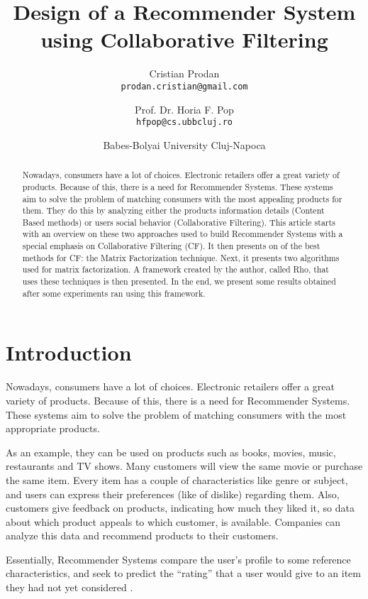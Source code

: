 \documentclass[10pt,a4paper]{article}  %
\title{Design of a Recommender System using Collaborative Filtering}
\author{
    Cristian Prodan \\ 
		\small{\texttt{prodan.cristian@gmail.com}} \\
		\and
		Prof. Dr. Horia F. Pop \\
		\small{\texttt{hfpop@cs.ubbcluj.ro}} \\
}
\date{Babes-Bolyai University Cluj-Napoca}
\begin{document}
\maketitle


\begin{abstract}
    \small{Nowadays, consumers have a lot of choices. Electronic retailers offer a great variety of products. Because of this, there is a need for Recommender Systems. These systems aim to solve the problem of matching consumers with the most appealing products for them. They do this by analyzing either the products information details (Content Based methods) or users social behavior (Collaborative Filtering). This article starts with an overview on these two approaches used to build Recommender Systems with a special emphasis on Collaborative Filtering (CF). It then presents on of the best methods for CF: the Matrix Factorization technique. Next, it presents two algorithms used for matrix factorization. A framework created by the author, called Rho, that uses these techniques is then presented. In the end, we present some results obtained after some experiments ran using this framework.}
\end{abstract}


\section{Introduction}

Nowadays, consumers have a lot of choices. Electronic retailers offer a great variety of products. Because of this, there is a need for Recommender Systems. These systems aim to solve the problem of matching consumers with the most appropriate products. 

As an example, they can be used on products such as books, movies, music, restaurants and TV shows. Many customers will view the same movie or purchase the same item. Every item has a couple of characteristics like genre or subject, and users can express their preferences (like of dislike) regarding them. Also, customers give feedback on products, indicating how much they liked it, so data about which product appeals to which customer, is available. Companies can analyze this data and recommend products to their customers.

Essentially, Recommender Systems compare the user's profile to some reference characteristics, and seek to predict the ``rating'' that a user would give to an item they had not yet considered \cite{wikipedia_rec_syst_def}. 
\end{document}
